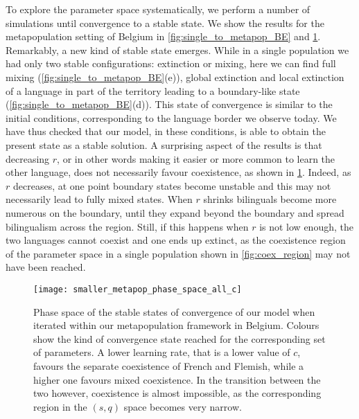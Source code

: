 \documentclass[../thesis.tex]{subfiles}
\begin{document}
To explore the parameter space systematically, we perform a number of simulations until
convergence to a stable state. We show the results for the metapopulation setting of
Belgium in \cref{fig:single_to_metapop_BE} and \cref{fig:metapop_phase_space_all_c}.
Remarkably, a new kind of stable state emerges. While in a single population we had only
two stable configurations: extinction or mixing, here we can find full mixing
(\cref{fig:single_to_metapop_BE}(e)), global extinction and local extinction of a
language in part of the territory leading to a boundary-like state
(\cref{fig:single_to_metapop_BE}(d)). This state of convergence is similar to the
initial conditions, corresponding to the language border we observe today. We have thus
checked that our model, in these conditions, is able to obtain the present state as a
stable solution. A surprising aspect of the results is that decreasing $r$, or in other
words making it easier or more common to learn the other language, does not necessarily
favour coexistence, as shown in \cref{fig:metapop_phase_space_all_c}. Indeed, as $r$
decreases, at one point boundary states become unstable and this may not necessarily
lead to fully mixed states. When $r$ shrinks bilinguals become more numerous on the
boundary, until they expand beyond the boundary and spread bilingualism across the
region. Still, if this happens when $r$ is not low enough, the two languages cannot
coexist and one ends up extinct, as the coexistence region of the parameter space in a
single population shown in \cref{fig:coex_region} may not have been reached. 
\begin{figure}[p]
  \centering
  \texttt{[image: smaller\_metapop\_phase\_space\_all\_c]}
  \caption{Phase space of the stable states of convergence of our model when iterated
  within our metapopulation framework in Belgium. Colours show the kind of convergence
  state reached for the corresponding set of parameters. A lower learning rate, that is
  a lower value of $c$, favours the separate coexistence of French and Flemish, while a
  higher one favours mixed coexistence. In the transition between the two however,
  coexistence is almost impossible, as the corresponding region in the $(s,q)$ space
  becomes very narrow.
  }
  \label{fig:metapop_phase_space_all_c}
\end{figure}

\end{document}
